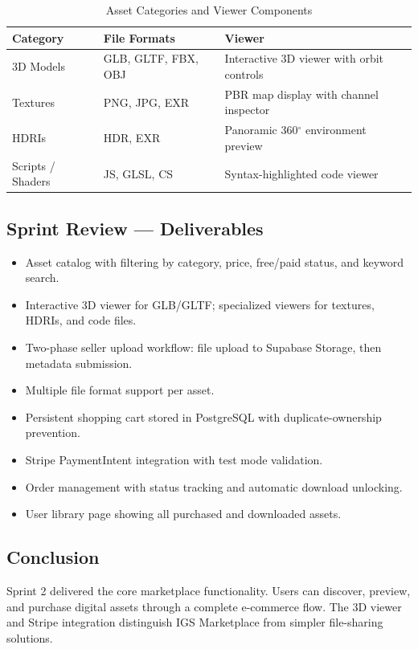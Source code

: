 \begin{table}[H]
\centering
\caption{Asset Categories and Viewer Components}
\begin{tabular}{L{3cm} L{3.5cm} L{7cm}}
\toprule
\textbf{Category} & \textbf{File Formats} & \textbf{Viewer} \\
\midrule
3D Models  & GLB, GLTF, FBX, OBJ & Interactive 3D viewer with orbit controls \\
Textures   & PNG, JPG, EXR        & PBR map display with channel inspector \\
HDRIs      & HDR, EXR             & Panoramic 360$^\circ$ environment preview \\
Scripts / Shaders & JS, GLSL, CS  & Syntax-highlighted code viewer \\
\bottomrule
\end{tabular}
\end{table}

\subsection{Sprint Review --- Deliverables}

\begin{itemize}
  \item Asset catalog with filtering by category, price, free/paid status, and keyword search.
  \item Interactive 3D viewer for GLB/GLTF; specialized viewers for textures, HDRIs, and code files.
  \item Two-phase seller upload workflow: file upload to Supabase Storage, then metadata submission.
  \item Multiple file format support per asset.
  \item Persistent shopping cart stored in PostgreSQL with duplicate-ownership prevention.
  \item Stripe PaymentIntent integration with test mode validation.
  \item Order management with status tracking and automatic download unlocking.
  \item User library page showing all purchased and downloaded assets.
\end{itemize}

\subsection*{Conclusion}
Sprint 2 delivered the core marketplace functionality. Users can discover, preview, and purchase digital assets through a complete e-commerce flow. The 3D viewer and Stripe integration distinguish IGS Marketplace from simpler file-sharing solutions.
